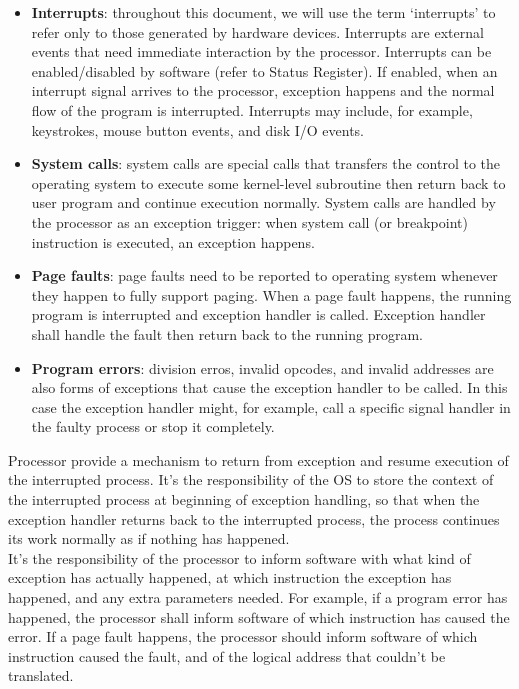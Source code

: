 \documentclass[oneside]{book}
\begin{document}
\begin{itemize}

\item \textbf{Interrupts}: throughout this document, we will use
      the term `interrupts' to refer only to those generated by hardware
      devices. Interrupts are external events that need immediate
      interaction by the processor. Interrupts can be enabled/disabled
      by software (refer to Status Register). If enabled, when an
      interrupt signal arrives to the processor, exception happens
      and the normal flow of the program is interrupted. Interrupts
      may include, for example, keystrokes, mouse button events,
      and disk I/O events.

\item \textbf{System calls}: system calls are special calls that
      transfers the control to the operating system to execute
      some kernel-level subroutine then return back to user
      program and continue execution normally. System calls
      are handled by the processor as an exception trigger:
      when system call (or breakpoint) instruction is executed,
      an exception happens.

\item \textbf{Page faults}: page faults need to be reported to
      operating system whenever they happen to fully support
      paging. When a page fault happens, the running program is
      interrupted and exception handler is called. Exception
      handler shall handle the fault then return back to the
      running program.

\item \textbf{Program errors}: division erros, invalid opcodes,
      and invalid addresses are also forms of exceptions that
      cause the exception handler to be called. In this case
      the exception handler might, for example, call a specific
      signal handler in the faulty process or stop it completely.

\end{itemize}

Processor provide a mechanism to return from exception and resume
execution of the interrupted process. It's the responsibility
of the OS to store the context of the interrupted process
at beginning of exception handling, so that when the exception
handler returns back to the interrupted process, the process
continues its work normally as if nothing has happened.\\

It's the responsibility of the processor to inform software with
what kind of exception has actually happened, at which
instruction the exception has happened, and any extra parameters
needed. For example, if a program error has happened, the processor
shall inform software of which instruction has caused the error.
If a page fault happens, the processor should inform software
of which instruction caused the fault, and of the logical
address that couldn't be translated.\\
\end{document}
